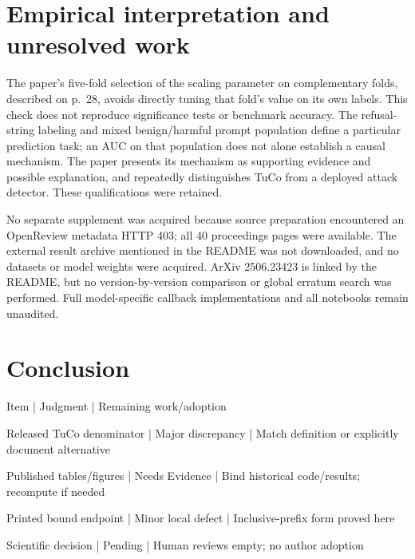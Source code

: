 \documentclass[10pt]{article}
\begin{document}
\section*{Empirical interpretation and unresolved work}
The paper’s five-fold selection of the scaling parameter on complementary folds, described on p. 28, avoids directly tuning that fold’s value on its own labels. This check does not reproduce significance tests or benchmark accuracy. The refusal-string labeling and mixed benign/harmful prompt population define a particular prediction task; an AUC on that population does not alone establish a causal mechanism. The paper presents its mechanism as supporting evidence and possible explanation, and repeatedly distinguishes TuCo from a deployed attack detector. These qualifications were retained.\par
No separate supplement was acquired because source preparation encountered an OpenReview metadata HTTP 403; all 40 proceedings pages were available. The external result archive mentioned in the README was not downloaded, and no datasets or model weights were acquired. ArXiv 2506.23423 is linked by the README, but no version-by-version comparison or global erratum search was performed. Full model-specific callback implementations and all notebooks remain unaudited.\par
\section*{Conclusion}
Item | Judgment | Remaining work/adoption\par
Released TuCo denominator | Major discrepancy | Match definition or explicitly document alternative\par
Published tables/figures | Needs Evidence | Bind historical code/results; recompute if needed\par
Printed bound endpoint | Minor local defect | Inclusive-prefix form proved here\par
Scientific decision | Pending | Human reviews empty; no author adoption\par
\end{document}
